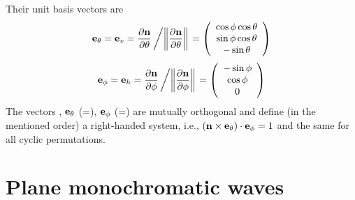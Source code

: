 %
Their unit basis vectors are
\begin{equation}
  \label{eq:polarization:etheta}
   \VctStl{e}_\theta = \eVrt =
    \PrtDrv{\VctStl{n}}{\theta} \left/ 
     \left\| \PrtDrv{\VctStl{n}}{\theta}\right\| \right.  
    =
    \ColVct{\cos\phi \cos\theta}%
           {\sin\phi \cos\theta}%
           { -\sin\theta}
\end{equation}
%
\begin{equation}
  \label{eq:polarization:ephi}
   \VctStl{e}_\phi = \eHor = 
    \PrtDrv{\VctStl{n}}{\phi} \left/ 
          \left\|\PrtDrv{\VctStl{n}}{\phi}\right\| \right.  
    =
    \ColVct{-\sin\phi}%
           {\cos\phi}%
           { 0}
\end{equation}
The vectors , $\mathbf{e}_\theta$ (=\eVrt),
$\mathbf{e}_\phi$ (=\eHor) are
mutually orthogonal and define (in the mentioned order) a right-handed
system, i.e., 
$\left(\mathbf{n}\times \mathbf{e}_\theta\right) \cdot
\mathbf{e}_\phi = 1$ and the same for all cyclic permutations.


\section{Plane monochromatic waves}
\label{sec:polarization:monochrom}

